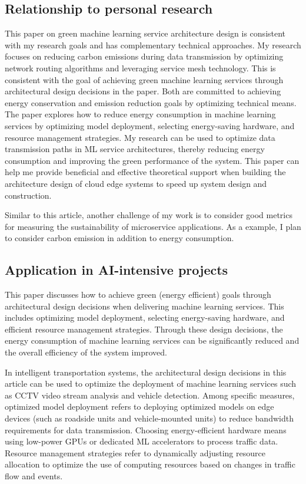 \documentclass[11pt]{report}
\begin{document}
\subsection{Relationship to personal research}
\label{subsec:relevance1}

This paper on green machine learning service architecture design is consistent with my research goals and has complementary technical approaches. My research focuses on reducing carbon emissions during data transmission by optimizing network routing algorithms and leveraging service mesh technology. This is consistent with the goal of achieving green machine learning services through architectural design decisions in the paper. Both are committed to achieving energy conservation and emission reduction goals by optimizing technical means. The paper explores how to reduce energy consumption in machine learning services by optimizing model deployment, selecting energy-saving hardware, and resource management strategies. My research can be used to optimize data transmission paths in ML service architectures, thereby reducing energy consumption and improving the green performance of the system. This paper can help me provide beneficial and effective theoretical support when building the architecture design of cloud edge systems to speed up system design and construction.

Similar to this article, another challenge of my work is to consider good metrics for measuring the sustainability of microservice applications. As a example, I plan to consider carbon emission in addition to energy consumption.

\subsection{Application in AI-intensive projects}
\label{subsec:integration1}

This paper discusses how to achieve green (energy efficient) goals through architectural design decisions when delivering machine learning services. This includes optimizing model deployment, selecting energy-saving hardware, and efficient resource management strategies. Through these design decisions, the energy consumption of machine learning services can be significantly reduced and the overall efficiency of the system improved.

In intelligent transportation systems, the architectural design decisions in this article can be used to optimize the deployment of machine learning services such as CCTV video stream analysis and vehicle detection. Among specific measures, optimized model deployment refers to deploying optimized models on edge devices (such as roadside units and vehicle-mounted units) to reduce bandwidth requirements for data transmission. Choosing energy-efficient hardware means using low-power GPUs or dedicated ML accelerators to process traffic data. Resource management strategies refer to dynamically adjusting resource allocation to optimize the use of computing resources based on changes in traffic flow and events.
\end{document}

